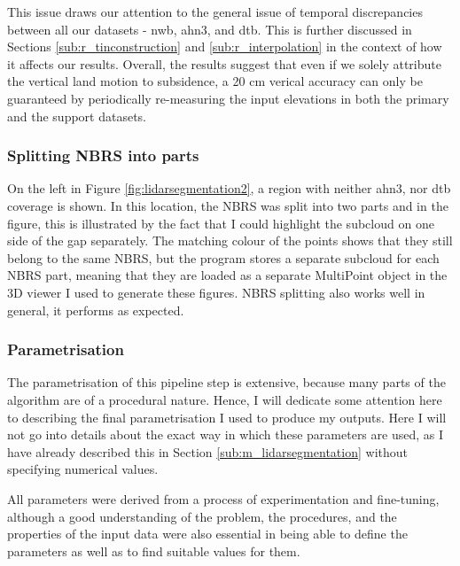 This issue draws our attention to the general issue of temporal discrepancies between all our datasets - \ac{nwb}, \ac{ahn3}, and \ac{dtb}. This is further discussed in Sections \ref{sub:r_tinconstruction} and \ref{sub:r_interpolation} in the context of how it affects our results. Overall, the results suggest that even if we solely attribute the vertical land motion to subsidence, a 20 cm verical accuracy can only be guaranteed by periodically re-measuring the input elevations in both the primary and the support datasets.

\subsubsection{Splitting NBRS into parts}

On the left in Figure \ref{fig:lidarsegmentation2}, a region with neither \ac{ahn3}, nor \ac{dtb} coverage is shown. In this location, the NBRS was split into two parts and in the figure, this is illustrated by the fact that I could highlight the subcloud on one side of the gap separately. The matching colour of the points shows that they still belong to the same NBRS, but the program stores a separate subcloud for each NBRS part, meaning that they are loaded as a separate MultiPoint object in the 3D viewer I used to generate these figures. NBRS splitting also works well in general, it performs as expected.

\subsubsection{Parametrisation}

The parametrisation of this pipeline step is extensive, because many parts of the algorithm are of a procedural nature. Hence, I will dedicate some attention here to describing the final parametrisation I used to produce my outputs. Here I will not go into details about the exact way in which these parameters are used, as I have already described this in Section \ref{sub:m_lidarsegmentation} without specifying numerical values.

All parameters were derived from a process of experimentation and fine-tuning, although a good understanding of the problem, the procedures, and the properties of the input data were also essential in being able to define the parameters as well as to find suitable values for them.

